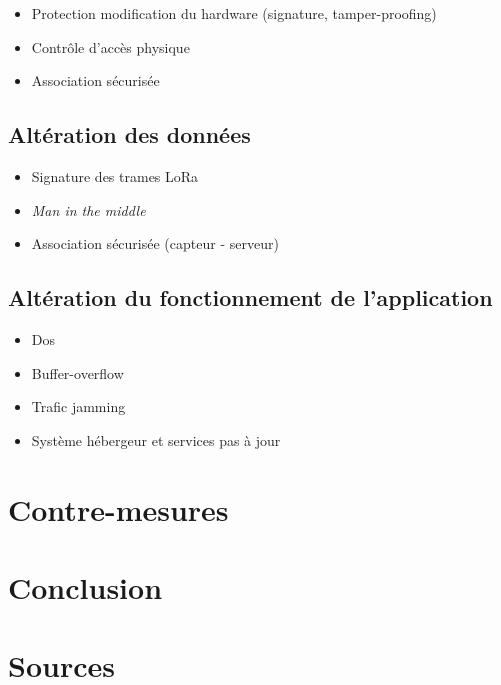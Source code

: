 \documentclass[12pt]{article}
\begin{document}
\begin{itemize}
\item Protection modification du hardware (signature, tamper-proofing)
\item Contrôle d'accès physique
\item Association sécurisée
\end{itemize}

\subsection{Altération des données}

\begin{itemize}
\item Signature des trames LoRa
\item \emph{Man in the middle}
\item Association sécurisée (capteur - serveur)
\end{itemize}

\subsection{Altération du fonctionnement de l'application}

\begin{itemize}
\item Dos
\item Buffer-overflow
\item Trafic jamming
\item Système hébergeur et services pas à jour
\end{itemize}

\section{Contre-mesures}
\label{sec:contremesures}

\section{Conclusion}
\label{sec:conclusion}

\section{Sources}
\label{sec:sources}
\end{document}
